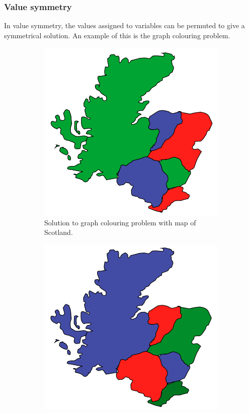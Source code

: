\documentclass[CS4402-Notes.tex]{subfiles}
\begin{document}
\subsubsection{Value symmetry}
In value symmetry, the values assigned to variables can be permuted to give a symmetrical solution. An example of this is the graph colouring problem.
\begin{figure}[H]
\begin{subfigure}{0.42\textwidth}
  \includegraphics[width=1\textwidth, keepaspectratio]{imgs/map-colouring1.png}
  \caption{Solution to graph colouring problem with map of Scotland.}
\end{subfigure}
\hspace*{\fill}
\begin{subfigure}{0.42\textwidth}
  \includegraphics[width=1\textwidth, keepaspectratio]{imgs/map-colouring2.png}

\end{subfigure}
\end{figure}
\end{document}
